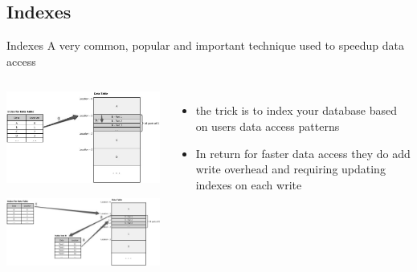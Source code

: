 \documentclass[9pt]{beamer}
\begin{document}
\subsection{Indexes}
\begin{frame}{Indexes}
  A very common, popular and important technique used to speedup data access

  \pause
 \begin{columns}
    \includegraphics[width=60mm, height=30mm, scale=0.4]{img/indexing.jpg}
    \includegraphics[width=60mm, height=30mm, scale=0.4]{img/indexlayers.jpg}

    \begin{itemize}
    \item the trick is to index your database based on users data access patterns
    \item In return for faster data access they do add write overhead and requiring updating indexes on each write
    \end{itemize}
  \end{columns}
\end{frame}

\end{document}
